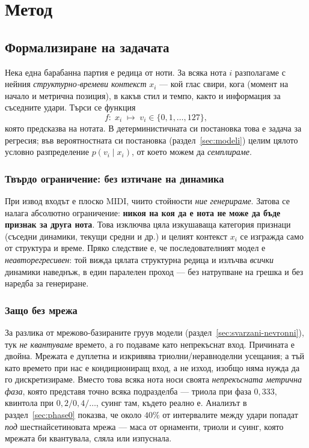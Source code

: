 \chapter{Метод}
\label{ch:metod}

\section{Формализиране на задачата}
\label{sec:formalizirane}

Нека една барабанна партия е редица от ноти. За всяка нота $i$ разполагаме с
нейния \emph{структурно-времеви контекст} $x_i$ — кой глас свири, кога (момент на
начало и метрична позиция), в какъв стил и темпо, както и информация за съседните
удари. Търси се функция
\[
  f:\; x_i \;\longmapsto\; v_i \in \{0,1,\dots,127\},
\]
която предсказва  на нотата. В детерминистичната си постановка това
е задача за регресия; във вероятностната си постановка (раздел~\ref{sec:modeli})
целим цялото условно разпределение $p(v_i \mid x_i)$, от което можем да
\emph{семплираме}.

\subsection{Твърдо ограничение: без изтичане на динамика}
\label{sec:no-leakage}

При извод входът е плоско MIDI, чиито  стойности \emph{ние
генерираме}. Затова се налага абсолютно ограничение: \textbf{никоя 
на коя да е нота не може да бъде признак за друга нота}. Това изключва цяла
изкушаваща категория признаци (съседни динамики, текущи средни и др.) и целият
контекст $x_i$ се изгражда само от структура и време. Пряко следствие е, че
последователният модел е \emph{неавторегресивен}: той вижда цялата структурна
редица и излъчва \emph{всички} динамики наведнъж, в един паралелен проход — без
натрупване на грешка и без наредба за генериране.

\subsection{Защо без мрежа}
\label{sec:no-grid}

За разлика от мрежово-базираните груув модели (раздел~\ref{sec:svarzani-nevronni}),
тук \emph{не квантуваме} времето, а го подаваме като непрекъснат вход. Причината
е двойна. Мрежата е дуплетна и изкривява триолни/неравноделни усещания; а тъй
като времето при нас е кондициониращ вход, а не изход, изобщо няма нужда да го
дискретизираме. Вместо това всяка нота носи своята \emph{непрекъсната метрична
фаза}, която представя точно всяка подразделба — триола при фаза $0{,}333$,
квинтола при $0{,}2/0{,}4/\dots$, суинг там, където реално е. Анализът в
раздел~\ref{sec:phase0} показва, че около $40\%$ от интервалите между удари
попадат \emph{под} шестнайсетиновата мрежа — маса от орнаменти, триоли и суинг,
която мрежата би квантувала, сляла или изпуснала.

